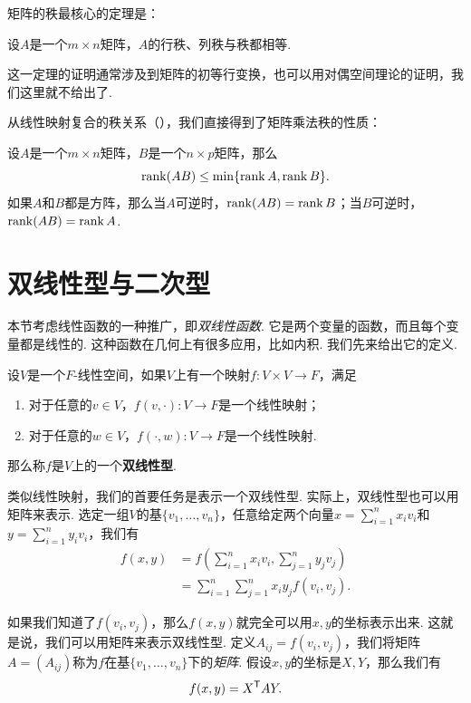 矩阵的秩最核心的定理是：

\begin{theorem}\label{thm:rank}
    设$A$是一个$m\times n$矩阵，$A$的行秩、列秩与秩都相等. 
\end{theorem}

这一定理的证明通常涉及到矩阵的初等行变换，也可以用对偶空间理论的证明，我们这里就不给出了. 

从线性映射复合的秩关系（），我们直接得到了矩阵乘法秩的性质：

\begin{proposition}\label{prop:rank-multiplication}
    设$A$是一个$m\times n$矩阵，$B$是一个$n\times p$矩阵，那么
    \[\operatorname*{rank}(AB)\leq \min\{\operatorname*{rank} A,\operatorname*{rank} B\}.\]
如果$A$和$B$都是方阵，那么当$A$可逆时，$\operatorname*{rank}(AB)=\operatorname*{rank} B$；当$B$可逆时，$\operatorname*{rank}(AB)=\operatorname*{rank} A$.
\end{proposition}

\section{双线性型与二次型}

本节考虑线性函数的一种推广，即\textit{双线性函数}. 它是两个变量的函数，而且每个变量都是线性的. 这种函数在几何上有很多应用，比如内积. 我们先来给出它的定义. 

\begin{definition}[双线性型]\label{def:bilinear-form}
    设$V$是一个$F$-线性空间，如果$V$上有一个映射$f:V\times V\to F$，满足
    \begin{enumerate}
        \item 对于任意的$v\in V$，$f(v,\cdot):V\to F$是一个线性映射；
        \item 对于任意的$w\in V$，$f(\cdot,w):V\to F$是一个线性映射. 
    \end{enumerate}
    那么称$f$是$V$上的一个\textbf{双线性型}. 
\end{definition}

类似线性映射，我们的首要任务是表示一个双线性型. 实际上，双线性型也可以用矩阵来表示. 选定一组$V$的基$\{v_1,\dots,v_n\}$，任意给定两个向量$x=\sum_{i=1}^n x_iv_i$和$y=\sum_{i=1}^n y_iv_i$，我们有
\begin{align*}
    f(x,y)&=f\left(\sum_{i=1}^n x_iv_i,\sum_{j=1}^n y_jv_j\right)\\
    &=\sum_{i=1}^n\sum_{j=1}^n x_iy_jf(v_i,v_j).
\end{align*}

如果我们知道了$f(v_i,v_j)$，那么$f(x,y)$就完全可以用$x,y$的坐标表示出来. 这就是说，我们可以用矩阵来表示双线性型. 定义$A_{ij}=f(v_i,v_j)$，我们将矩阵$A=(A_{ij})$称为$f$在基$\{v_1,\dots,v_n\}$下的\textit{矩阵}. 假设$x,y$的坐标是$X,Y$，那么我们有
\[
    f(x,y)=X^{\mathsf{T}} AY.
\]


